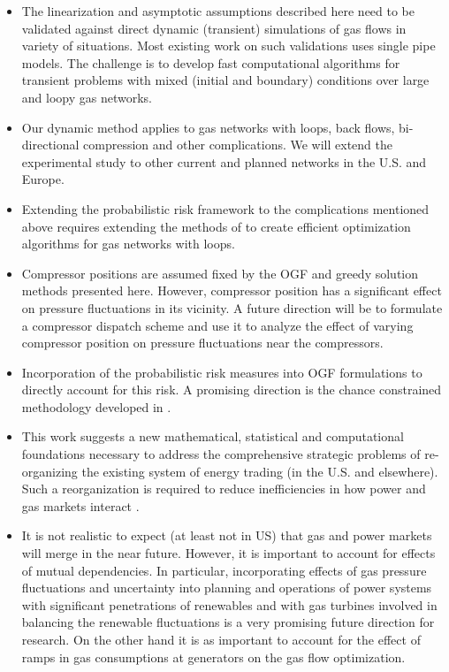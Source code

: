 \documentclass[10pt, conference, compsocconf]{IEEEtran}
\begin{document}
\begin{itemize}
\item The linearization and asymptotic assumptions described here need to be validated against direct dynamic (transient) simulations of gas flows in variety of situations. Most existing work on such validations \cite{84Osi,87TT,98TT,00ZA,11DF,12ABG} uses single pipe models.  The challenge is to develop fast computational algorithms for transient problems with  mixed (initial and boundary) conditions over large and loopy gas networks.
\item Our dynamic method applies to gas networks with loops, back flows, bi-directional compression and other complications. We will extend the experimental study to other current and planned networks in the U.S. and Europe.
\item Extending the probabilistic risk framework to the complications mentioned above requires extending the methods of \cite{13MFBBCP} to create efficient optimization algorithms for gas networks with loops.
\item
Compressor positions are assumed fixed by the OGF and greedy solution
methods presented here.  However, compressor position has a significant effect
on pressure fluctuations in its vicinity.  A future direction will be to
formulate a compressor dispatch scheme and use it to analyze the
effect of varying compressor position on pressure fluctuations near
the compressors.

\item Incorporation of the probabilistic risk measures into OGF formulations to directly account for this risk.  A promising direction is the chance constrained methodology developed in \cite{14BCH}.
\item This work suggests a new mathematical, statistical and computational foundations necessary to address the comprehensive strategic problems of re-organizing the existing system of energy trading (in the U.S. and elsewhere).  Such a reorganization is required to reduce inefficiencies in how power and gas markets interact \cite{2010MITEI,2013MITEI,14TA}.
\item It is not realistic to expect (at least not in US) that gas and power markets will merge in the near future. However, it is important to account for effects of mutual dependencies. In particular, incorporating effects of gas pressure fluctuations and uncertainty into planning and operations of power systems with significant penetrations of renewables and with gas turbines involved in balancing the renewable fluctuations is a very promising future direction for research. On the other hand it is as important to account for the effect of ramps in gas consumptions at generators on the gas flow optimization.
\end{itemize}








{\small


}
\end{document}
